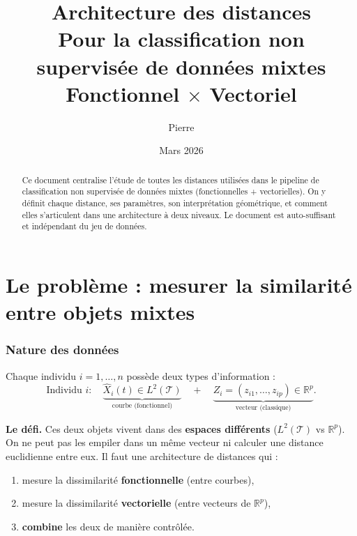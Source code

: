 \documentclass[11pt, a4paper]{article}
\title{%
  \textbf{Architecture des distances} \\[0.3em]
  \Large Pour la classification non supervisée de données mixtes \\[0.2em]
  \large Fonctionnel $\times$ Vectoriel
}
\author{Pierre}
\date{Mars 2026}
\newcommand{\R}{\mathbb{R}}
\newcommand{\Ltwo}{L^2(\mathcal{T})}
\theoremstyle{definition}
\theoremstyle{remark}
\begin{document}
\maketitle

\begin{abstract}
Ce document centralise l'étude de toutes les distances utilisées dans le
pipeline de classification non supervisée de données mixtes
(fonctionnelles + vectorielles). On y définit chaque distance, ses paramètres,
son interprétation géométrique, et comment elles s'articulent dans une
architecture à deux niveaux. Le document est auto-suffisant et indépendant
du jeu de données.
\end{abstract}

\tableofcontents
\newpage

\part{Le problème : mesurer la similarité entre objets mixtes}

\section{Nature des données}

Chaque individu $i = 1, \ldots, n$ possède deux types d'information :
\[
  \text{Individu } i : \quad
  \underbrace{\hat{X}_i(t) \in \Ltwo}_{\text{courbe (fonctionnel)}}
  \quad + \quad
  \underbrace{Z_i = (z_{i1}, \ldots, z_{ip}) \in \R^p}_{\text{vecteur (classique)}}.
\]

\textbf{Le défi.} Ces deux objets vivent dans des \textbf{espaces différents}
($\Ltwo$ vs $\R^p$). On ne peut pas les empiler dans un même vecteur ni
calculer une distance euclidienne entre eux. Il faut une architecture de
distances qui :
\begin{enumerate}[nosep]
  \item mesure la dissimilarité \textbf{fonctionnelle} (entre courbes),
  \item mesure la dissimilarité \textbf{vectorielle} (entre vecteurs de $\R^p$),
  \item \textbf{combine} les deux de manière contrôlée.
\end{enumerate}
\end{document}

